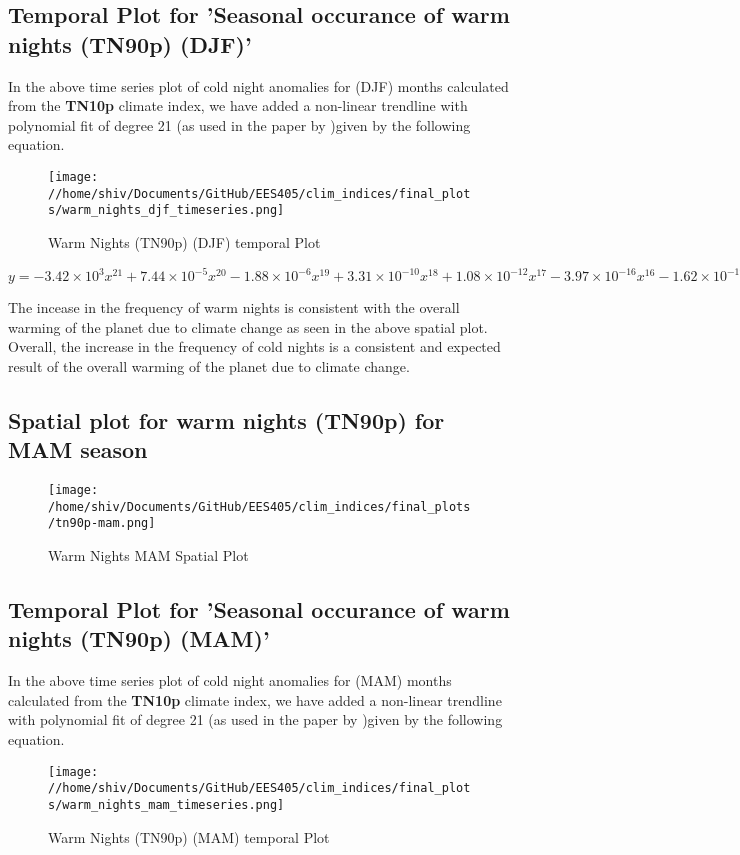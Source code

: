 \documentclass[a4paper, 12pt, twoside]{report}
\begin{document}
\subsection{Temporal Plot for 'Seasonal occurance of warm nights (TN90p) (DJF)'}
In the above time series plot of cold night anomalies for (DJF) months calculated from the \textbf{TN10p} climate index, we have added a non-linear trendline with polynomial fit of degree 21 (as used in the paper by )given by the following equation.
\begin{figure}[htb]
    \centering
    \texttt{[image: //home/shiv/Documents/GitHub/EES405/clim\_indices/final\_plots/warm\_nights\_djf\_timeseries.png]}
    \caption{Warm Nights (TN90p) (DJF) temporal Plot}
    \label{fig:tn90p_djf_temporal}
\end{figure}

$ y = -3.42\times10^{3}x^{21}+7.44\times10^{-5}x^{20}-1.88\times10^{-6}x^{19}+3.31\times10^{-10}x^{18}+1.08\times10^{-12}x^{17}-3.97\times10^{-16}x^{16}-1.62\times10^{-19}x^{15}+1.05\times10^{-22}x^{14}-5.80\times10^{-27}x^{13}-8.00\times10^{-30}x^{12}+2.29\times10^{-33}x^{11}-1.20\times10^{-37}x^{10}-6.72\times10^{-41}x^{9}+1.99\times10^{-44}x^{8}-2.95\times10^{-48}x^{7}+2.85\times10^{-52}x^{6}-1.92\times10^{-56}x^{5}+9.12\times10^{-61}x^{4}-3.03\times10^{-65}x^{3}+6.69\times10^{-70}x^{2}-8.87\times10^{-75}x+5.34\times10^{-80}$

The incease in the frequency of warm nights is consistent with the overall warming of the planet due to climate change as seen in the above spatial plot.\\
Overall, the increase in the frequency of cold nights is a consistent and expected result of the overall warming of the planet due to climate change.

\subsection{Spatial plot for warm nights (TN90p) for MAM season}
\begin{figure}[htb]
    \centering
    \texttt{[image: /home/shiv/Documents/GitHub/EES405/clim\_indices/final\_plots/tn90p-mam.png]}
    \caption{Warm Nights MAM Spatial Plot}
    \label{fig:tn90p_mam_spatial}
\end{figure}

\subsection{Temporal Plot for 'Seasonal occurance of warm nights (TN90p) (MAM)'}
In the above time series plot of cold night anomalies for (MAM) months calculated from the \textbf{TN10p} climate index, we have added a non-linear trendline with polynomial fit of degree 21 (as used in the paper by )given by the following equation. \\
\begin{figure}[htb]
    \centering
    \texttt{[image: //home/shiv/Documents/GitHub/EES405/clim\_indices/final\_plots/warm\_nights\_mam\_timeseries.png]}
    \caption{Warm Nights (TN90p) (MAM) temporal Plot}
    \label{fig:tn90p_mam_temporal}
\end{figure}
\end{document}
